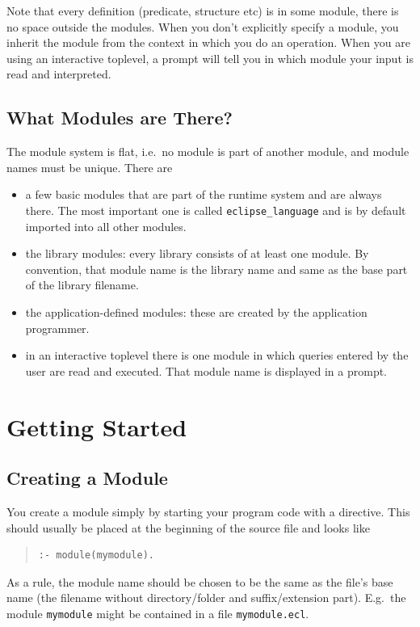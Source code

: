 Note that every definition (predicate, structure etc) is in some module,
there is no space outside the modules. When you don't explicitly
specify a module, you inherit the module from the context in which
you do an operation. When you are using an interactive {\eclipse}
toplevel, a prompt will tell you in which module your input is
read and interpreted.

\subsection{What Modules are There?}

The module system is flat, i.e.\ no module is part of another module, 
and module names must be unique. There are
\begin{itemize}
\item a few basic modules that are part of the {\eclipse} runtime
	system and are always there. The most important one is
	called {\tt eclipse_language} and is by default imported
	into all other modules.
\item the library modules: every library consists of at least one
	module. By convention, that module name is the library name
	and same as the base part of the library filename.
\item the application-defined modules: these are created by the
	application programmer.
\item in an interactive {\eclipse} toplevel there is one module
	in which queries entered by the user are read and executed.
	That module name is displayed in a prompt.
\end{itemize}


\section{Getting Started}
\subsection{Creating a Module}

You create a module simply by starting your program code with a
directive.  This should usually be placed at the beginning of the source file
and looks like
\begin{quote}\begin{verbatim}
:- module(mymodule).
\end{verbatim}\end{quote}
As a rule, the module name should be chosen to be the same as the
file's base name (the filename without directory/folder and
suffix/extension part). E.g.\ the module {\tt mymodule} might be
contained in a file {\tt mymodule.ecl}.

